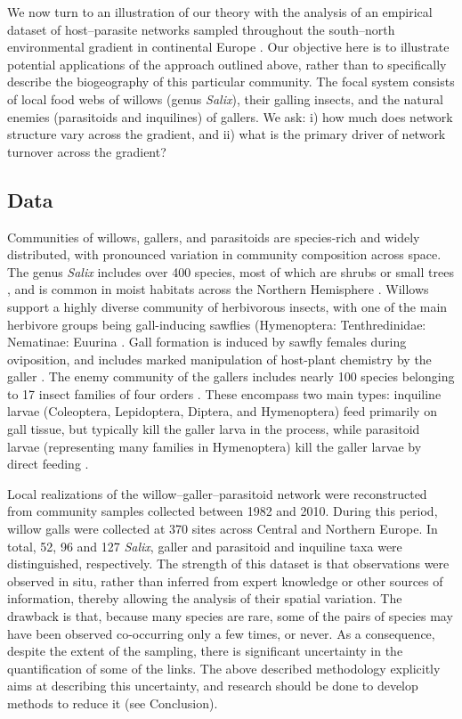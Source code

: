 \documentclass[12pt]{article}
\begin{document}
We now turn to an illustration of our theory with the analysis of an empirical
dataset of host–parasite networks sampled throughout the south–north
environmental gradient in continental Europe \citep{Kopelke2017}. Our
objective here is to illustrate potential applications of the approach
outlined above, rather than to specifically describe the biogeography
of this particular community. The focal system consists of local food webs of
willows (genus \textit{Salix}), their galling insects, and the natural enemies
(parasitoids and inquilines) of gallers. We ask:
i) how much does network structure vary across the gradient, and ii) what is
the primary driver of network turnover across the gradient?

\subsection*{Data}

Communities of willows, gallers, and parasitoids are species-rich and widely
distributed, with pronounced variation in community composition across space.
The genus \textit{Salix} includes over 400 species, most of which are shrubs
or small trees \citep{Argus1997}, and is common in moist habitats across the
Northern Hemisphere \citep{Skvortsov1999}. Willows support a highly diverse
community of herbivorous insects, with one of the main herbivore groups being
gall-inducing sawflies (Hymenoptera: Tenthredinidae: Nematinae: Euurina
\citep{Kopelke1999}. Gall formation is induced by sawfly females during
oviposition, and includes marked manipulation of host-plant chemistry by the
galler \citep{Nyman2000}. The enemy community of the gallers includes nearly
100 species belonging to 17 insect families of four orders
\citep{Kopelke2003}. These encompass two main types: inquiline larvae
(Coleoptera, Lepidoptera, Diptera, and Hymenoptera) feed primarily on gall
tissue, but typically kill the galler larva in the process, while parasitoid
larvae (representing many families in Hymenoptera) kill the galler larvae by
direct feeding \citep{Kopelke2003}. 

Local realizations of the willow–galler–parasitoid network were reconstructed
from community samples collected between 1982 and 2010. During this period,
willow galls were collected at 370 sites across Central and Northern Europe.
In total, 52, 96 and 127 \textit{Salix}, galler and parasitoid and inquiline
taxa were distinguished, respectively. The strength of this dataset is that
observations were observed in situ, rather than inferred from expert knowledge
or other sources of information, thereby allowing the analysis of their
spatial variation. The drawback is that, because many species are rare, some
of the pairs of species may have been observed co-occurring only a few times,
or never. As a consequence, despite the extent of the sampling, there is significant uncertainty in the quantification of some of the links. The above described methodology explicitly aims at describing this uncertainty, and research should be done to develop methods to reduce it (see Conclusion). 
\end{document}
